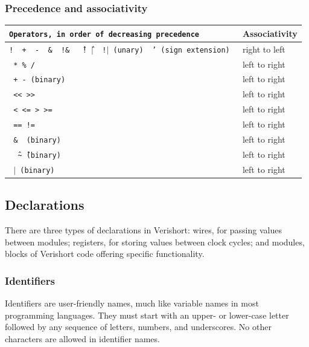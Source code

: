 \documentclass[letterpaper,11pt]{article}
\begin{document}
        
        \subsubsection{Precedence and associativity}
        
        \begin{center} 
        \begin{tabular}{|>{\texttt\bgroup}l<{\egroup}|l|}
        \hline
        Operators, in order of decreasing precedence &Associativity\\ \hline
        ! \ + \ - \ \& \ !\&	 \ \^ \ !\^ 	\ $\mid$ \ !$\mid$ (unary) \ ' (sign extension) &	 right to left \\ \hline
        * \% /	& 	left to right \\ \hline
        	+ - (binary)		& 	left to right \\ \hline
        << >> & 	left to right \\ \hline
        < <= > >=					& 	left to right \\ \hline
        == !=				&	left to right \\ \hline
        \& \ (binary)				&	left to right \\ \hline
        \^ \ \textasciitilde\^ \ (binary)		&	left to right \\ \hline
        $\mid$ (binary)				&	left to right \\ \hline
        
        \end{tabular}
        \end{center}
        
    \subsection{Declarations}
    There are three types of declarations in Verishort: wires, for passing values between
    modules; registers, for storing values between clock cycles; and modules, blocks of
    Verishort code offering specific functionality.\\
    
        \subsubsection{Identifiers}
        Identifiers are user-friendly names, much like variable names in most programming
        languages.  They must start with an upper- or lower-case letter followed by any 
        sequence of letters, numbers, and underscores.  No other characters are allowed in
        identifier names.\\
        
\end{document}
